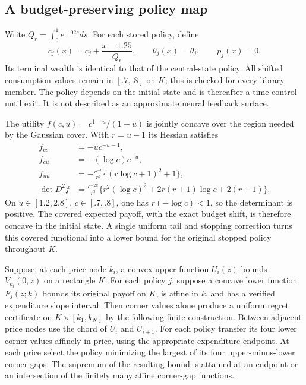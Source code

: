 \subsection{A budget-preserving policy map}
Write $Q_r=\int_0^1e^{-.02s}ds$. For each stored policy, define
\begin{equation}
 c_j(x)=c_j+\frac{x-1.25}{Q_r},\qquad
 \theta_j(x)=\theta_j,\qquad p_j(x)=0.\label{eq:budgetshift}
\end{equation}
Its terminal wealth is identical to that of the central-state policy. All shifted consumption values remain in $[.7,.8]$ on $K$; this is checked for every library member. The policy depends on the initial state and is thereafter a time control until exit. It is not described as an approximate neural feedback surface.

The utility $f(c,u)=c^{1-u}/(1-u)$ is jointly concave over the region needed by the Gaussian cover. With $r=u-1$ its Hessian satisfies
\begin{align*}
 f_{cc}&=-u c^{-u-1},\\
 f_{cu}&=-(\log c)c^{-u},\\
 f_{uu}&=-\frac{c^{-r}}{r^3}\{(r\log c+1)^2+1\},\\
 \det D^2f&=\frac{c^{-2u}}{r^3}
 \{r^2(\log c)^2+2r(r+1)\log c+2(r+1)\}.
\end{align*}
On $u\in[1.2,2.8]$, $c\in[.7,.8]$, one has $r(-\log c)<1$, so the determinant is positive. The covered expected payoff, with the exact budget shift, is therefore concave in the initial state. A single uniform tail and stopping correction turns this covered functional into a lower bound for the original stopped policy throughout $K$.

\begin{proposition}\label{prop:stateprice}
Suppose, at each price node $k_i$, a convex upper function $U_i(z)$ bounds $V_{k_i}(0,z)$ on a rectangle $K$. For each policy $j$, suppose a concave lower function $F_j(z;k)$ bounds its original payoff on $K$, is affine in $k$, and has a verified expenditure slope interval. Then corner values alone produce a uniform regret certificate on $K\times[k_1,k_N]$ by the following finite construction. Between adjacent price nodes use the chord of $U_i$ and $U_{i+1}$. For each policy transfer its four lower corner values affinely in price, using the appropriate expenditure endpoint. At each price select the policy minimizing the largest of its four upper-minus-lower corner gaps. The supremum of the resulting bound is attained at an endpoint or an intersection of the finitely many affine corner-gap functions.
\end{proposition}

